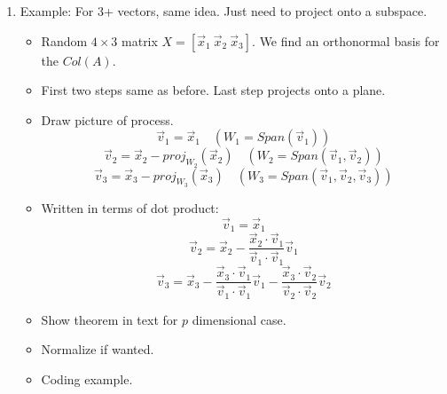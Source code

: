 \documentclass{article}
\begin{document}
\begin{enumerate}
\begin{enumerate}
\item Example: For 3+ vectors, same idea. Just need to project onto a subspace.
\begin{itemize}
\item Random $4 \times 3$ matrix $X = [\vec{x}_1~\vec{x}_2~\vec{x}_3]$. We find an orthonormal basis for the $Col(A)$. 
\item First two steps same as before. Last step projects onto a plane.
\item Draw picture of process.
\[
\vec{v}_1 = \vec{x}_1 \quad (W_1 = Span(\vec{v}_1))
\] \[
\vec{v}_2 = \vec{x}_2 - proj_{W_2}(\vec{x}_2) \quad (W_2 = Span(\vec{v}_1, \vec{v}_2)) 
\] \[
\vec{v}_3 = \vec{x}_3 - proj_{W_3}(\vec{x}_3) \quad (W_3 = Span(\vec{v}_1, \vec{v}_2, \vec{v}_3))
\]
\item Written in terms of dot product:
\[
\vec{v}_1 = \vec{x}_1 
\] \[
\vec{v}_2 = \vec{x}_2 - \frac{\vec{x}_2 \cdot \vec{v}_1}{\vec{v}_1 \cdot \vec{v}_1} \vec{v}_1
\] \[
\vec{v}_3 = \vec{x}_3 - \frac{\vec{x}_3 \cdot \vec{v}_1}{\vec{v}_1 \cdot \vec{v}_1}\vec{v}_1 -  \frac{\vec{x}_3 \cdot \vec{v}_2}{\vec{v}_2 \cdot \vec{v}_2}\vec{v}_2
\]
\item Show theorem in text for $p$ dimensional case.
\item Normalize if wanted.
\item Coding example.
\end{itemize}

\end{enumerate}


\end{enumerate}
\end{document}
